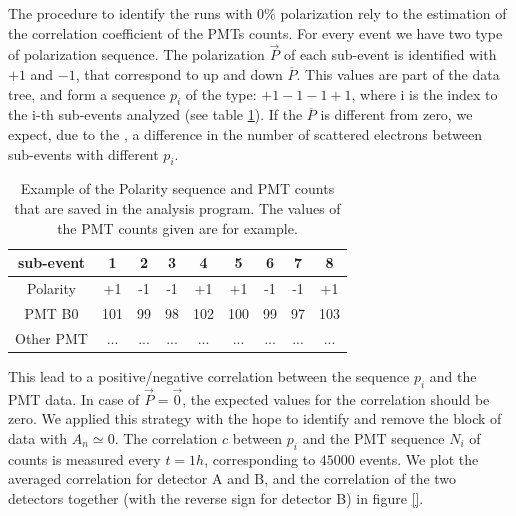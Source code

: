 The procedure to identify the runs with $0\%$ polarization rely to the estimation of the correlation coefficient of the PMTs counts. For every event we have two type of polarization sequence. The polarization $\vec{P}$ of each sub-event is identified with $+1$ and $-1$, that correspond to up and down $\overline{P}$. This values are part of the data tree, and form a sequence $p_{i}$ of the type: $+1-1-1+1$, where i is the index to the i-th sub-events analyzed (see table \ref{tab:PolarizationSequence}). If the $\overline{P}$ is different from zero, we expect, due to the \transv , a difference in the number of scattered electrons between sub-events with different $p_{i}$.

\begin{table}[hbtp]
\centering
\begin{tabular}{c|c|c|c|c|c|c|c|c}
\hline 
sub-event & 1 & 2 & 3 & 4 & 5 & 6 & 7 & 8 \\ 
\hline 
Polarity & +1 & -1 & -1 & +1 & +1 & -1 & -1 & +1 \\ 
PMT B0 & 101 & 99 & 98 & 102 & 100 & 99 & 97 & 103 \\ 
Other PMT & ... & ... & ... & ... & ... & ... & ... & ... \\ 
\hline
\end{tabular}
\caption{Example of the Polarity sequence and PMT counts that are saved in the analysis program. The values of the PMT counts given are for example.}
\label{tab:PolarizationSequence}
\end{table}

This lead to a positive/negative correlation between the sequence $p_{i}$ and the PMT data. In case of $\vec{P} = \vec{0}$, the expected values for the correlation should be zero.
We applied this strategy with the hope to identify and remove the block of data with $A_{n} \simeq 0$. The correlation $c$ between $p_{i}$ and the PMT sequence $N_{i}$ of counts is measured every $t = 1 h$, corresponding to $45000$ events. We plot the averaged correlation for detector A and B, and the correlation of the two detectors together (with the reverse sign for detector B) in figure \ref{}.

